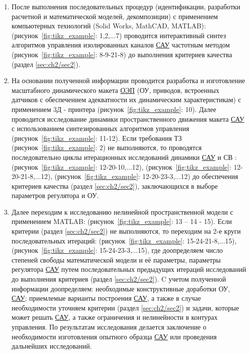 \begin{enumerate}
	\item После выполнения последовательных процедур (идентификации, разработки расчетной и математической моделей, декомпозиции) с применением компьютерных технологий (Solid Works, MathCAD, MATLAB): (рисунок~\ref{fig:tikz_example}: 1,2,...7) проводится интерактивный синтез алгоритмов управления изолированных каналов \hyperref[acroSAU]{САУ} частотным методом \cite[]{Bessekerski20} (рисунок~\ref{fig:tikz_example}: 8-9-21-8) до выполнения критериев качества (раздел \ref{sec:ch2/sec2}). 
	\item На основании полученной информации проводится разработка и изготовление масштабного динамического макета \hyperref[acroEOS]{ОЭП} (ОУ, приводов, встроенных датчиков с обеспечением адекватности их динамическим характеристикам) с применением 3Д - принтера (рисунок~\ref{fig:tikz_example}: 10). Далее проводится исследование динамики пространственного движения макета \hyperref[acroSAU]{САУ} с использованием синтезированных алгоритмов управления (рисунок~\ref{fig:tikz_example}: 11-12). Если требования ТЗ (рисунок~\ref{fig:tikz_example}: 2) не выполняются, то проводятся последовательно циклы итерационных исследований динамики \hyperref[acroSAU]{САУ} и СВ : (рисунок~\ref{fig:tikz_example}: 12-20-10,...12), (рисунок~\ref{fig:tikz_example}: 12-20-21-8,...12), (рисунок~\ref{fig:tikz_example}: 12-20-23-3,...12) до обеспечения критериев качества (раздел \ref{sec:ch2/sec2}), заключающихся в выборе параметров регулятора и ОУ.
	\item Далее переходим к исследованию нелинейной пространственной модели с применением MATLAB: 
	(рисунок~\ref{fig:tikz_example}: 13 – 14 - 15). Если критерии (раздел \ref{sec:ch2/sec2}) не выполняются, то переходим на 2-е круги последовательных итераций: (рисунок~\ref{fig:tikz_example}: 15-24-21-8,...15), (рисунок~\ref{fig:tikz_example}: 15-24-23-3,...15), где доопределяем число степеней свободы математической модели и её параметры, параметры регулятора \hyperref[acroSAU]{САУ} путем последовательных предыдущих итераций исследований до выполнения критериев (раздел \ref{sec:ch2/sec2}). C учетом полученной информации доопределяем: необходимые конструктивные доработки ОУ, \hyperref[acroSAU]{САУ}; приемлемые варианты построения \hyperref[acroSAU]{САУ}, а также в случае необходимости уточняем критерии (раздел \ref{sec:ch2/sec2}) и задачи, которые может решать \hyperref[acroSAU]{САУ}, а также ограничения и нелинейности в контурах управления. По результатам исследования делается заключение о необходимости изготовления опытного образца \hyperref[acroSAU]{САУ} или проведения дальнейших исследований.
	

\end{enumerate}
